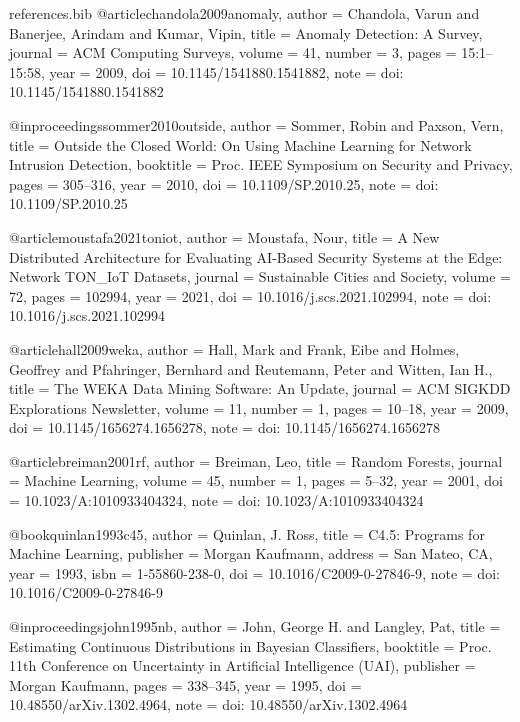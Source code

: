 \begin{filecontents*}[overwrite]{references.bib}
@article{chandola2009anomaly,
  author  = {Chandola, Varun and Banerjee, Arindam and Kumar, Vipin},
  title   = {Anomaly Detection: A Survey},
  journal = {ACM Computing Surveys},
  volume  = {41},
  number  = {3},
  pages   = {15:1--15:58},
  year    = {2009},
  doi     = {10.1145/1541880.1541882},
  note    = {doi: 10.1145/1541880.1541882}
}

@inproceedings{sommer2010outside,
  author    = {Sommer, Robin and Paxson, Vern},
  title     = {Outside the Closed World: On Using Machine Learning for Network Intrusion Detection},
  booktitle = {Proc. IEEE Symposium on Security and Privacy},
  pages     = {305--316},
  year      = {2010},
  doi       = {10.1109/SP.2010.25},
  note      = {doi: 10.1109/SP.2010.25}
}

@article{moustafa2021toniot,
  author  = {Moustafa, Nour},
  title   = {A New Distributed Architecture for Evaluating {AI}-Based Security Systems at the Edge: Network {TON\_IoT} Datasets},
  journal = {Sustainable Cities and Society},
  volume  = {72},
  pages   = {102994},
  year    = {2021},
  doi     = {10.1016/j.scs.2021.102994},
  note    = {doi: 10.1016/j.scs.2021.102994}
}

@article{hall2009weka,
  author  = {Hall, Mark and Frank, Eibe and Holmes, Geoffrey and Pfahringer, Bernhard and Reutemann, Peter and Witten, Ian H.},
  title   = {The {WEKA} Data Mining Software: An Update},
  journal = {ACM SIGKDD Explorations Newsletter},
  volume  = {11},
  number  = {1},
  pages   = {10--18},
  year    = {2009},
  doi     = {10.1145/1656274.1656278},
  note    = {doi: 10.1145/1656274.1656278}
}

@article{breiman2001rf,
  author  = {Breiman, Leo},
  title   = {Random Forests},
  journal = {Machine Learning},
  volume  = {45},
  number  = {1},
  pages   = {5--32},
  year    = {2001},
  doi     = {10.1023/A:1010933404324},
  note    = {doi: 10.1023/A:1010933404324}
}

@book{quinlan1993c45,
  author    = {Quinlan, J. Ross},
  title     = {C4.5: Programs for Machine Learning},
  publisher = {Morgan Kaufmann},
  address   = {San Mateo, CA},
  year      = {1993},
  isbn      = {1-55860-238-0},
  doi       = {10.1016/C2009-0-27846-9},
  note      = {doi: 10.1016/C2009-0-27846-9}
}

@inproceedings{john1995nb,
  author    = {John, George H. and Langley, Pat},
  title     = {Estimating Continuous Distributions in {Bayesian} Classifiers},
  booktitle = {Proc. 11th Conference on Uncertainty in Artificial Intelligence (UAI)},
  publisher = {Morgan Kaufmann},
  pages     = {338--345},
  year      = {1995},
  doi       = {10.48550/arXiv.1302.4964},
  note      = {doi: 10.48550/arXiv.1302.4964}
}


\end{filecontents*}
